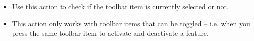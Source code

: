 
\begin{itemize}
\item Use this action to check if the toolbar item is currently selected or not.
\item This action only works with toolbar items that can be toggled -- i.e. when you press the same toolbar item to activate and deactivate a feature. 
\end{itemize}
